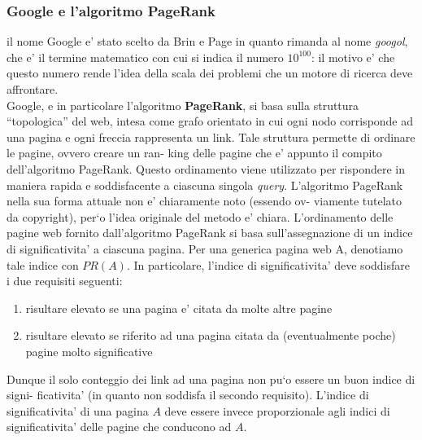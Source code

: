 \documentclass[a4paper,12pt]{article}
\begin{document}
\subsubsection{Google e l’algoritmo PageRank}
il nome Google e' stato scelto da Brin e Page in
quanto rimanda al nome \textit{googol}, che e' il termine matematico con cui si indica il numero
$10^{100}$: il motivo e' che questo numero rende l’idea della scala dei problemi che un motore
di ricerca deve affrontare.\\
Google, e in particolare l’algoritmo \textbf{PageRank}, si basa sulla struttura “topologica” del
web, intesa come grafo orientato in cui ogni nodo corrisponde ad una pagina e ogni freccia
rappresenta un link. Tale struttura permette di ordinare le pagine, ovvero creare un ran-
king delle pagine che e' appunto il compito dell’algoritmo PageRank. Questo ordinamento
viene utilizzato per rispondere in maniera rapida e soddisfacente a ciascuna singola \textit{query}.
\vspace{5px} L’algoritmo PageRank nella sua forma attuale non e' chiaramente noto (essendo ov-
viamente tutelato da copyright), per`o l’idea originale del metodo e' chiara. L’ordinamento
delle pagine web fornito dall’algoritmo PageRank si basa sull’assegnazione di un indice di
significativita' a ciascuna pagina. Per una generica pagina web A, denotiamo tale indice
con $PR(A)$. In particolare, l’indice di significativita'
deve soddisfare i due requisiti seguenti:
\begin{enumerate}
  \item risultare elevato se una pagina e' citata da molte altre pagine
  \item risultare elevato se riferito ad una pagina citata da (eventualmente poche) pagine molto
significative
\end{enumerate}Dunque il solo conteggio dei link ad una pagina non pu`o essere un buon indice di signi-
ficativita' (in quanto non soddisfa il secondo requisito). L’indice di significativita' di una
pagina $A$ deve essere invece proporzionale agli indici di significativita' delle pagine che
conducono ad $A$.
\end{document}
